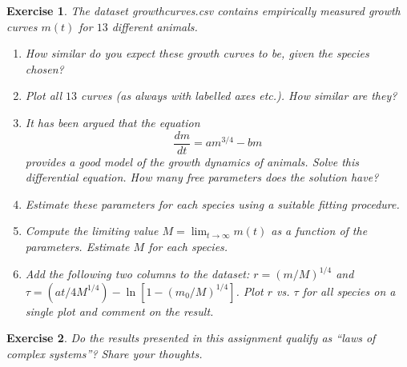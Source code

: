 \documentclass[english, 11pt]{article}
\newtheorem{Ex}{Exercise}
\begin{document}
\begin{Ex}
		The dataset growth\textunderscore curves.csv contains empirically measured growth curves $m(t)$ for $13$ different animals.
		\begin{enumerate}
			\item How similar do you expect these growth curves to be, given the species chosen?
			\item Plot all $13$ curves (as always with labelled axes etc.). How similar are they?
			\item It has been argued that the equation $$\frac{dm}{dt}=am^{3/4}-bm$$ provides a good model of the growth dynamics of animals. Solve this differential equation. How many free parameters does the solution have?
			\item Estimate these parameters for each species using a suitable fitting procedure. 
			\item Compute the limiting value $M=\lim_{t\to\infty}m(t)$ as a function of the  parameters. Estimate $M$ for each species. 
			\item Add the following two columns to the dataset: $r=(m/M)^{1/4}$ and $\tau=(at/4M^{1/4})-\ln[1-(m_0/M)^{1/4}]$. Plot $r$ vs. $\tau$ for all species on a single plot and comment on the result.
		\end{enumerate}
\end{Ex}


\begin{Ex}
Do the results presented in this assignment qualify as ``laws of complex systems''? Share your thoughts.  	
\end{Ex}



  
\end{document}
